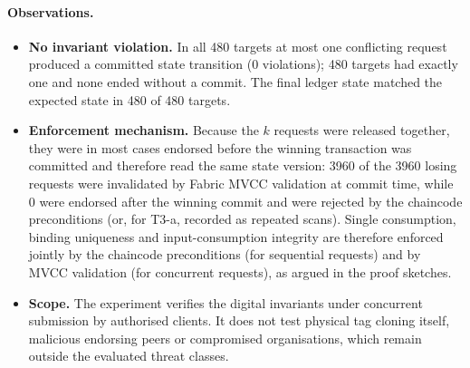 \paragraph{Observations.}
\begin{itemize}
  \item \textbf{No invariant violation.} In all 480 targets at most one conflicting request produced a
        committed state transition (0 violations); 480 targets had exactly one
        and none ended without a commit. The final ledger
        state matched the expected state in 480 of 480 targets.
  \item \textbf{Enforcement mechanism.} Because the $k$ requests were released together, they were in most
        cases endorsed before the winning transaction was committed and therefore read the same state version:
        3960 of the 3960 losing requests were invalidated by Fabric MVCC validation
        at commit time, while 0 were endorsed after the winning commit and were rejected by the
        chaincode preconditions (or, for T3-a, recorded as repeated scans). Single consumption, binding uniqueness
        and input-consumption integrity are therefore enforced jointly by the chaincode preconditions (for
        sequential requests) and by MVCC validation (for concurrent requests), as argued in the proof sketches.
  \item \textbf{Scope.} The experiment verifies the digital invariants under concurrent submission by
        authorised clients. It does not test physical tag cloning itself, malicious endorsing peers or
        compromised organisations, which remain outside the evaluated threat classes.
\end{itemize}
